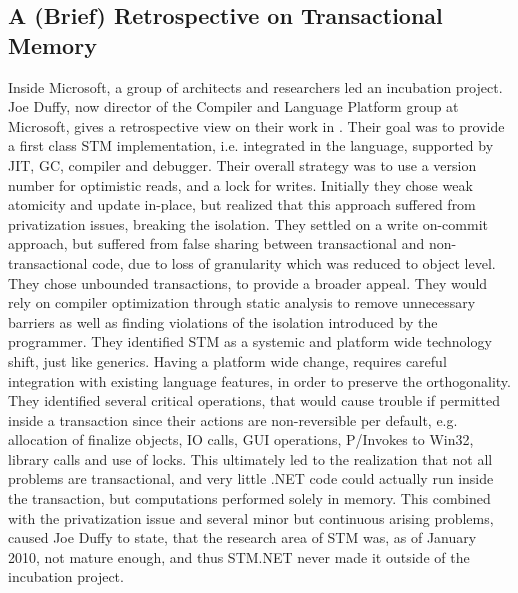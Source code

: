 \subsection{A (Brief) Retrospective on Transactional Memory}
Inside Microsoft, a group of architects and researchers led an incubation project. Joe Duffy, now director of the Compiler and Language Platform group at Microsoft, gives a retrospective view on their work in \cite{duffy2010stmnet}. Their goal was to provide a first class \ac{STM} implementation, i.e. integrated in the language, supported by \ac{JIT}, \ac{GC}, compiler and debugger. Their overall strategy was to use a version number for optimistic reads, and a lock for writes. Initially they chose weak atomicity and update in-place, but realized that this approach suffered from privatization issues, breaking the isolation. They settled on a write on-commit approach, but suffered from false sharing between transactional and non-transactional code, due to loss of granularity which was reduced to object level. They chose unbounded transactions, to provide a broader appeal. They would rely on compiler optimization through static analysis to remove unnecessary barriers as well as finding violations of the isolation introduced by the programmer. They identified \ac{STM} as a systemic and platform wide technology shift, just like generics. Having a platform wide change, requires careful integration with existing language features, in order to preserve the orthogonality. They identified several critical operations, that would cause trouble if permitted inside a transaction since their actions are non-reversible per default, e.g. allocation of finalize objects, \ac{IO} calls, GUI operations, P/Invokes to Win32, library calls and use of locks. This ultimately led to the realization that not all problems are transactional, and very little .NET code could actually run inside the transaction, but computations performed solely in memory. This combined with the privatization issue and several minor but continuous arising problems, caused Joe Duffy to state, that the research area of \ac{STM} was, as of January 2010, not mature enough, and thus STM.NET never made it outside of the incubation project.

